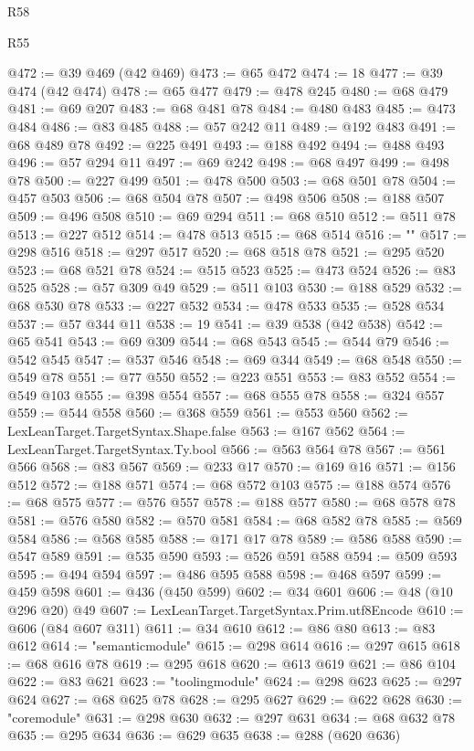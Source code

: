 \begin{lexlean}{R58}
\begin{lexlean}{R55}
\begin{coremodule}
{{{{{{{{{{{{{{{{{{{{{{{{{{{{{{{{{{{{{{{{{{{{{{{{{{{{{{{{{{{{{@472 := @39 @469 (@42 @469)
@473 := @65 @472
@474 := 18
@477 := @39 @474 (@42 @474)
@478 := @65 @477
@479 := @478 @245
@480 := @68 @479
@481 := @69 @207
@483 := @68 @481 @78
@484 := @480 @483
@485 := @473 @484
@486 := @83 @485
@488 := @57 @242 @11
@489 := @192 @483
@491 := @68 @489 @78
@492 := @225 @491
@493 := @188 @492
@494 := @488 @493
@496 := @57 @294 @11
@497 := @69 @242
@498 := @68 @497
@499 := @498 @78
@500 := @227 @499
@501 := @478 @500
@503 := @68 @501 @78
@504 := @457 @503
@506 := @68 @504 @78
@507 := @498 @506
@508 := @188 @507
@509 := @496 @508
@510 := @69 @294
@511 := @68 @510
@512 := @511 @78
@513 := @227 @512
@514 := @478 @513
@515 := @68 @514
@516 := "{"
@517 := @298 @516
@518 := @297 @517
@520 := @68 @518 @78
@521 := @295 @520
@523 := @68 @521 @78
@524 := @515 @523
@525 := @473 @524
@526 := @83 @525
@528 := @57 @309 @49
@529 := @511 @103
@530 := @188 @529
@532 := @68 @530 @78
@533 := @227 @532
@534 := @478 @533
@535 := @528 @534
@537 := @57 @344 @11
@538 := 19
@541 := @39 @538 (@42 @538)
@542 := @65 @541
@543 := @69 @309
@544 := @68 @543
@545 := @544 @79
@546 := @542 @545
@547 := @537 @546
@548 := @69 @344
@549 := @68 @548
@550 := @549 @78
@551 := @77 @550
@552 := @223 @551
@553 := @83 @552
@554 := @549 @103
@555 := @398 @554
@557 := @68 @555 @78
@558 := @324 @557
@559 := @544 @558
@560 := @368 @559
@561 := @553 @560
@562 := LexLeanTarget.TargetSyntax.Shape.false
@563 := @167 @562
@564 := LexLeanTarget.TargetSyntax.Ty.bool
@566 := @563 @564 @78
@567 := @561 @566
@568 := @83 @567
@569 := @233 @17
@570 := @169 @16
@571 := @156 @512
@572 := @188 @571
@574 := @68 @572 @103
@575 := @188 @574
@576 := @68 @575
@577 := @576 @557
@578 := @188 @577
@580 := @68 @578 @78
@581 := @576 @580
@582 := @570 @581
@584 := @68 @582 @78
@585 := @569 @584
@586 := @568 @585
@588 := @171 @17 @78
@589 := @586 @588
@590 := @547 @589
@591 := @535 @590
@593 := @526 @591 @588
@594 := @509 @593
@595 := @494 @594
@597 := @486 @595 @588
@598 := @468 @597
@599 := @459 @598
@601 := @436 (@450 @599)
@602 := @34 @601
@606 := @48 (@10 @296 @20) @49
@607 := LexLeanTarget.TargetSyntax.Prim.utf8Encode
@610 := @606 (@84 @607 @311)
@611 := @34 @610
@612 := @86 @80
@613 := @83 @612
@614 := "semanticmodule"
@615 := @298 @614
@616 := @297 @615
@618 := @68 @616 @78
@619 := @295 @618
@620 := @613 @619
@621 := @86 @104
@622 := @83 @621
@623 := "toolingmodule"
@624 := @298 @623
@625 := @297 @624
@627 := @68 @625 @78
@628 := @295 @627
@629 := @622 @628
@630 := "coremodule"
@631 := @298 @630
@632 := @297 @631
@634 := @68 @632 @78
@635 := @295 @634
@636 := @629 @635
@638 := @288 (@620 @636)
}}}}}}}}}}}}}}}}}}}}}}}}}}}}}}}}}}}}}}}}}}}}}}}}}}}}}}}}}}}}}}
\end{coremodule}
\end{lexlean}
\end{lexlean}
